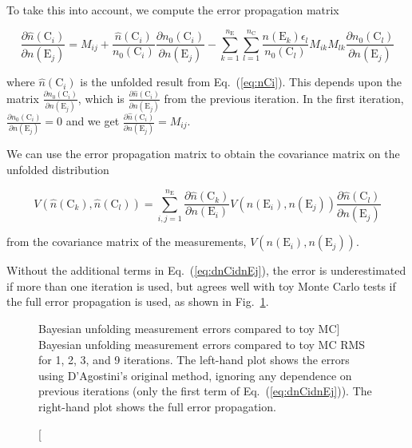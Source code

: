 \documentclass[12pt,a4paper]{article}
\newcommand{\E}{\mathrm{E}}
\newcommand{\C}{\mathrm{C}}
\newcommand{\dd}[2]{\frac{\partial{#1}}{\partial{#2}}}
\begin{document}
To take this into account, we compute the error propagation matrix

\begin{equation}
\dd{\hat{n}(\C_i)}{n(\E_j)} = M_{ij} + 
\frac{\hat{n}(\C_i)}{n_0(\C_i)} \dd{n_0(\C_i)}{n(\E_j)} -
\sum_{k=1}^{n_{\E}} \sum_{l=1}^{n_{\C}} \frac{n(\E_k) \epsilon_l}{n_0(\C_l)} M_{ik} M_{lk} \dd{n_0(\C_l)}{n(\E_j)}
\label{eq:dnCidnEj}
\end{equation}

where $\hat{n}(\C_i)$ is the unfolded result from Eq.~(\ref{eq:nCi}).
This depends upon the matrix $\dd{n_0(\C_i)}{n(\E_j)}$, which is $\dd{\hat{n}(\C_i)}{n(\E_j)}$ from the previous iteration.
In the first iteration, $\dd{n_0(\C_i)}{n(\E_j)}=0$ and we get $\dd{\hat{n}(\C_i)}{n(\E_j)} = M_{ij}$.

We can use the error propagation matrix to obtain the covariance matrix on the unfolded distribution

\begin{equation}
V(\hat{n}(\C_k),\hat{n}(\C_l)) = \sum_{i,j=1}^{n_{\E}} \dd{\hat{n}(\C_k)}{n(\E_i)} V(n(\E_i),n(\E_j)) \dd{\hat{n}(\C_l)}{n(\E_j)}
\label{eq:Vij}
\end{equation}

\noindent from the covariance matrix of the measurements, $V(n(\E_i),n(\E_j))$.

Without the additional terms in Eq.~(\ref{eq:dnCidnEj}),
the error is underestimated if more than one iteration
is used, but agrees well with toy Monte Carlo tests if the full error propagation is used,
as shown in Fig.~\ref{fig:bayes_errors}.%
\begin{figure}[ht]
%
\caption
[Bayesian unfolding measurement errors compared to toy MC]%
{Bayesian unfolding measurement errors compared to toy MC RMS for 1, 2, 3, and 9 iterations.
The left-hand plot shows the errors using D'Agostini's original method,
ignoring any dependence on previous iterations (only the first term of Eq.~(\ref{eq:dnCidnEj})).
The right-hand plot shows the full error propagation.}%
\label{fig:bayes_errors}%
\end{figure}
\end{document}
